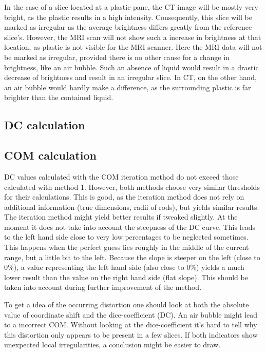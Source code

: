 In the case of a slice located at a plastic pane, the CT image will be mostly very bright, as the plastic results in a high intensity.
Consequently, this slice will be marked as irregular as the average brightness differs greatly from the reference slice's.
However, the MRI scan will not show such a increase in brightness at that location, as plastic is not visible for the MRI scanner.
Here the MRI data will not be marked as irregular, provided there is no other cause for a change in brightness, like an air bubble.
Such an absence of liquid would result in a drastic decrease of brightness and result in an irregular slice.
In CT, on the other hand, an air bubble would hardly make a difference, as the surrounding plastic is far brighter than the contained liquid.

\subsection{DC calculation}
\label{sec:discussion_DC}

\subsection{COM calculation}
DC values calculated with the COM iteration method do not exceed those calculated with method 1.
However, both methods choose very similar thresholds for their calculations.
This is good, as the iteration method does not rely on additional information (true dimensions, radii of rods), but yields similar results.
The iteration method might yield better results if tweaked slightly.
At the moment it does not take into account the steepness of the DC curve.
This leads to the left hand side close to very low percentages to be neglected sometimes.
This happens when the perfect guess lies roughly in the middle of the current range, but a little bit to the left.
Because the slope is steeper on the left (close to 0\%), a value representing the left hand side (also close to 0\%) yields a much lower result than the value on the right hand side (flat slope).
This should be taken into account during further improvement of the method.




To get a idea of the occurring distortion one should look at both the absolute value of coordinate shift and the dice-coefficient (DC).
An air bubble might lead to a incorrect COM. Without looking at the dice-coefficient it's hard to tell why this distortion only appears to be present in a few slices.
If both indicators show unexpected local irregularities, a conclusion might be easier to draw.


